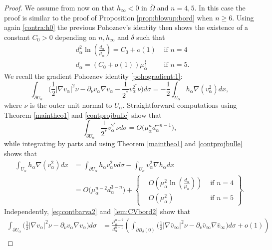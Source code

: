 \documentclass[10pt]{amsart}
\numberwithin{equation}{section}
\newcommand{\Om}{\Omega}
\newcommand{\ma}{\mu_\alpha}
\def \ma{\mu_{\alpha}}
\def \da{d_{\alpha}}
\theoremstyle{plain}
\theoremstyle{remark}
\begin{document}
\begin{proof}
We assume from now on that $h_\infty <0$ in $\overline{\Om}$ and $n=4,5$. In this case the proof is similar to the proof of Proposition \ref{prop:blowup:bord} when $n \ge 6$.  Using again  \eqref{contra:h0} the previous Pohozaev's identity then shows the existence of a constant $C_0 >0$ depending on $n, h_\infty$ and $\delta$ such that
\begin{equation} \label{pohogradient:0}
\begin{aligned}
& \da^2 \ln \left(\frac{d_\alpha}{\ma}\right) = C_0 +o(1) & \text{ if } n = 4 \\
& \da = (C_0 + o(1)) \ma^{\frac13} & \text{ if } n = 5.
\end{aligned}
\end{equation}
We recall the gradient Pohozaev identity  \eqref{pohogradient:1}:
\begin{equation*}
\int_{\partial U_\alpha} \Big( \frac12 |\nabla v_\alpha|^2 \nu - \partial_{\nu} v_\alpha \nabla v_\alpha - \frac{1}{2^*} v_{\alpha}^{2^*} \nu \Big) d \sigma  = - \frac12 \int_{U_\alpha} h_\alpha \nabla( v_\alpha^2) dx,
\end{equation*}
where $\nu$ is the outer unit normal to $U_\alpha$. Straightforward computations using Theorem \ref{maintheo1} and \eqref{contprojbulle} show that 
$$ \int_{\partial U_\alpha}  \frac{1}{2^*} v_{\alpha}^{2^*} \nu  d \sigma=  O \big( \ma^n \da^{-n-1}\big),$$
while  integrating by parts and using Theorem \ref{maintheo1} and \eqref{contprojbulle} shows that 
$$ \begin{aligned}
\int_{U_\alpha} h_\alpha \nabla( v_\alpha^2) dx &= \int_{\partial U_\alpha} h_\alpha v_\alpha^2 \nu d \sigma - \int_{U_\alpha} v_\alpha^2 \nabla h_\alpha dx \\
& = O \big( \ma^{n-2} \da^{3-n}\big) + \left \{ \begin{aligned} &  O \left( \ma^2\ln\left(\frac{d_\alpha}{\ma}\right) \right)  & \text{ if } n = 4 \\ & O (\ma^2) & \text{ if } n = 5 \end{aligned} \right \} . 
\end{aligned} $$
Independently, \eqref{eq:contbarva2} and \eqref{lem:CVbord2} show that 
$$ \begin{aligned} \int_{\partial U_\alpha} \Big( \frac12 |\nabla v_\alpha|^2 \nu - \partial_{\nu} v_\alpha \nabla v_\alpha  \Big) d \sigma & = \frac{\ma^{n-2}}{\da^{n-1}} \left(  \int_{\partial B_\delta(0)} \Big( \frac12 |\nabla \bar{v}_\infty|^2 \nu - \partial_{\nu} \bar{v}_\infty \nabla \bar{v}_\infty  \Big) d \sigma  + o(1) \right)  \\

\end{aligned}$$
\end{proof}
\end{document}
